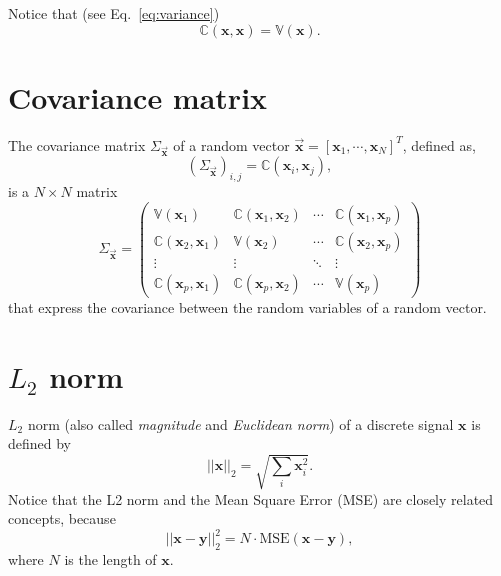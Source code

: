 Notice that (see Eq.~\ref{eq:variance})
\begin{equation}
  \mathbb{C}(\mathbf{x}, \mathbf{x}) = \mathbb{V}(\mathbf{x}).
\end{equation}


\section{Covariance matrix}
\label{sec:covariance_matrix}

The covariance matrix $\Sigma_{\overrightarrow{\mathbf{x}}}$ of a random vector $\overrightarrow{\mathbf{x}}=[\mathbf{x}_1,\cdots,\mathbf{x}_N]^T$, defined as,
\begin{equation}
  (\Sigma_{\overrightarrow{\mathbf{x}}})_{i,j}=\mathbb{C}(\mathbf{x}_i,\mathbf{x}_j),
\end{equation}
is a $N\times N$ matrix
\begin{equation}
\Sigma_{\overrightarrow{\mathbf{x}}} = 
\begin{pmatrix}
\mathbb{V}(\mathbf{x}_1) & \mathbb{C}(\mathbf{x}_1, \mathbf{x}_2) & \cdots & \mathbb{C}(\mathbf{x}_1, \mathbf{x}_p) \\
\mathbb{C}(\mathbf{x}_2, \mathbf{x}_1) & \mathbb{V}(\mathbf{x}_2) & \cdots & \mathbb{C}(\mathbf{x}_2, \mathbf{x}_p) \\
\vdots & \vdots & \ddots & \vdots \\
\mathbb{C}(\mathbf{x}_p, \mathbf{x}_1) & \mathbb{C}(\mathbf{x}_p, \mathbf{x}_2) & \cdots & \mathbb{V}(\mathbf{x}_p)
\end{pmatrix}
\end{equation}
that express the covariance between the random variables of a random vector.


\section{$L_2$ norm}
\label{sec:L2_norm}

$L_2$ norm (also called \emph{magnitude} and \emph{Euclidean norm}) of
a discrete signal $\mathbf{x}$ is defined by
\begin{equation}
  ||\mathbf{x}||_2 = \sqrt{\sum_i\mathbf{x}_i^2}.
\end{equation}
Notice that the L2 norm and the Mean Square Error (MSE) are closely
related concepts, because
\begin{equation}
  ||\mathbf{x} - \mathbf{y}||_2^2 = N\cdot\text{MSE}(\mathbf{x} - \mathbf{y}),
\end{equation}
where $N$ is the length of $\mathbf{x}$.


